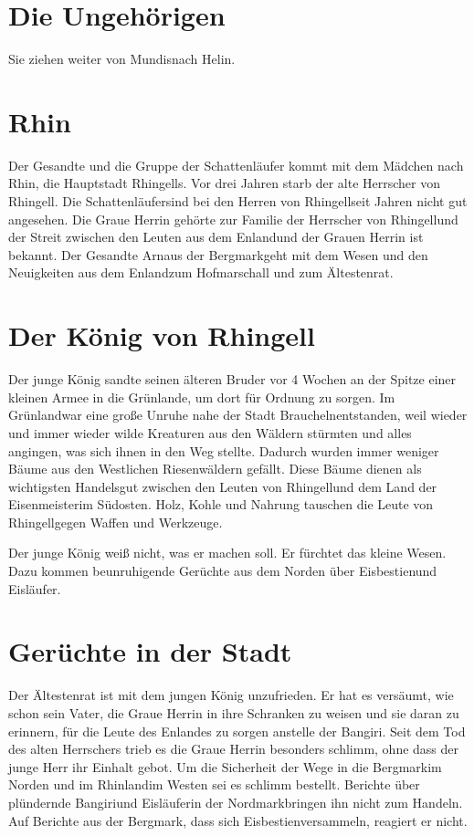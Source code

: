 \documentclass[12pt,a4paper,onecolumn,twoside,ngerman]{book}
\newcommand{\Bangiri}{Bangiri}
\newcommand{\Enland}{Enland}
\newcommand{\Schattenjager}{Schattenläufer}
\newcommand{\Nordmark}{Nordmark}
\newcommand{\Bergmark}{Bergmark}
\newcommand{\Arn}{Arn}
\newcommand{\Eislaufer}{Eisläufer}
\newcommand{\Eisbestien}{Eisbestien}
\newcommand{\Rhinland}{Rhinland}
\newcommand{\Rhingell}{Rhingell}
\newcommand{\Mundis}{Mundis}
\newcommand{\Helin}{Helin}
\newcommand{\Rhin}{Rhin}
\newcommand{\Grunland}{Grünland}
\newcommand{\Braucheln}{Braucheln}
\newcommand{\Eisenmeister}{Eisenmeister}
\begin{document}
\section{Die Ungehörigen}

Sie ziehen weiter von \Mundis nach \Helin.

\section{\Rhin}

Der Gesandte und die Gruppe der Schattenläufer kommt mit dem Mädchen nach \Rhin, die Hauptstadt \Rhingell{s}. Vor drei Jahren starb der alte Herrscher von \Rhingell. Die \Schattenjager sind bei den Herren von \Rhingell seit Jahren nicht gut angesehen. Die Graue Herrin gehörte zur Familie der Herrscher von \Rhingell und der Streit zwischen den Leuten aus dem \Enland und der Grauen Herrin ist bekannt. Der Gesandte \Arn aus der \Bergmark geht mit dem Wesen und den Neuigkeiten aus dem \Enland zum Hofmarschall und zum Ältestenrat.

\section{Der König von \Rhingell}
Der junge König sandte seinen älteren Bruder vor 4 Wochen an der Spitze einer kleinen Armee in die \Grunland{e}, um dort für Ordnung zu sorgen. Im \Grunland war eine große Unruhe nahe der Stadt \Braucheln entstanden, weil wieder und immer wieder wilde Kreaturen aus den Wäldern stürmten und alles angingen, was sich ihnen in den Weg stellte. Dadurch wurden immer weniger Bäume aus den Westlichen Riesenwäldern gefällt. Diese Bäume dienen als wichtigsten Handelsgut zwischen den Leuten von \Rhingell und dem Land der \Eisenmeister im Südosten. Holz, Kohle und Nahrung tauschen die Leute von \Rhingell gegen Waffen und Werkzeuge.

Der junge König weiß nicht, was er machen soll. Er fürchtet das kleine Wesen. Dazu kommen beunruhigende Gerüchte aus dem Norden über \Eisbestien und \Eislaufer. 

\section{Gerüchte in der Stadt}
Der Ältestenrat ist mit dem jungen König unzufrieden. Er hat es versäumt, wie schon sein Vater, die Graue Herrin in ihre Schranken zu weisen und sie daran zu erinnern, für die Leute des \Enland{es} zu sorgen anstelle der \Bangiri. Seit dem Tod des alten Herrschers trieb es die Graue Herrin besonders schlimm, ohne dass der junge Herr ihr Einhalt gebot. Um die Sicherheit der Wege in die \Bergmark im Norden und im \Rhinland im Westen sei es schlimm bestellt. Berichte über plündernde \Bangiri und \Eislaufer in der \Nordmark bringen ihn nicht zum Handeln. Auf Berichte aus der \Bergmark, dass sich \Eisbestien versammeln, reagiert er nicht.
\end{document}

